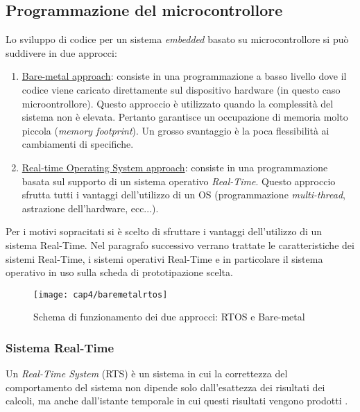 \subsection{Programmazione del microcontrollore}
	Lo sviluppo di codice per un sistema \textit{embedded} basato su microcontrollore si può suddivere in due approcci:
	\begin{enumerate}
		\item \underline{Bare-metal approach}: consiste in una programmazione a basso livello dove il codice viene caricato direttamente sul dispositivo hardware (in questo caso microontrollore).  Questo approccio è utilizzato quando la complessità del sistema non è elevata. Pertanto garantisce un occupazione di memoria molto piccola (\textit{memory footprint}). Un grosso svantaggio è la poca flessibilità ai cambiamenti di specifiche.
		\item \underline{Real-time Operating System approach}: consiste in una programmazione basata sul supporto di un sistema operativo \textit{Real-Time}. Questo approccio sfrutta tutti i vantaggi dell'utilizzo di un OS (programmazione \textit{multi-thread}, astrazione dell'hardware, ecc...).
	\end{enumerate}
	
	Per i motivi sopracitati si è scelto di sfruttare i vantaggi dell'utilizzo di un sistema Real-Time. Nel paragrafo successivo verrano trattate le caratteristiche dei sistemi Real-Time, i sistemi operativi Real-Time e in particolare il sistema operativo in uso sulla scheda di prototipazione scelta.
	
\begin{figure}  
  \begin{center}
    \texttt{[image: cap4/baremetalrtos]}
    \caption{Schema di funzionamento dei due approcci: RTOS e Bare-metal}
  \end{center}
\end{figure}
	
\subsubsection{Sistema Real-Time}

Un \textit{Real-Time System} (RTS) è un sistema in cui la correttezza del comportamento del sistema non dipende solo dall'esattezza dei risultati dei calcoli, ma anche dall'istante temporale in cui questi risultati vengono prodotti \cite{kopetzrt}.

